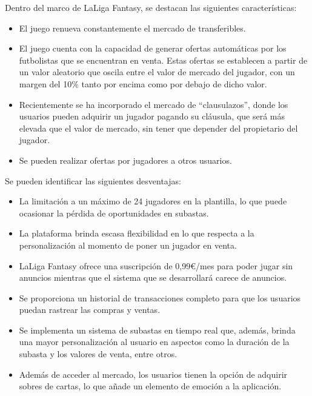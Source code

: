 Dentro del marco de LaLiga Fantasy, se destacan las siguientes características:
\begin{itemize}
    \item El juego renueva constantemente el mercado de transferibles.
    \item El juego cuenta con la capacidad de generar ofertas automáticas por los futbolistas que se encuentran en venta. Estas ofertas se establecen a partir de un valor aleatorio que oscila entre el valor de mercado del jugador, con un margen del 10\% tanto por encima como por debajo de dicho valor.
    \item Recientemente se ha incorporado el mercado de ``clausulazos'', donde los usuarios pueden adquirir un jugador pagando su cláusula, que será más elevada que el valor de mercado, sin tener que depender del propietario del jugador.
    \item Se pueden realizar ofertas por jugadores a otros usuarios.
\end{itemize}

Se pueden identificar las siguientes desventajas:
\begin{itemize}
    \item La limitación a un máximo de 24 jugadores en la plantilla, lo que puede ocasionar la pérdida de oportunidades en subastas.
    \item La plataforma brinda escasa flexibilidad en lo que respecta a la personalización al momento de poner un jugador en venta.
\end{itemize}

\begin{itemize}
    \item LaLiga Fantasy ofrece una suscripción de 0,99€/mes para poder jugar sin anuncios mientras que el sistema que se desarrollará carece de anuncios.
    \item Se proporciona un historial de transacciones completo para que los usuarios puedan rastrear las compras y ventas.
    \item Se implementa un sistema de subastas en tiempo real que, además, brinda una mayor personalización al usuario en aspectos como la duración de la subasta y los valores de venta, entre otros.
    \item Además de acceder al mercado, los usuarios tienen la opción de adquirir sobres de cartas, lo que añade un elemento de emoción a la aplicación.
\end{itemize}

